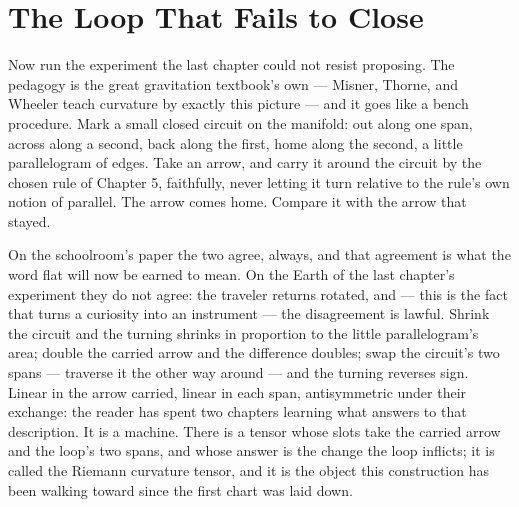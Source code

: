 \chapter{The Loop That Fails to Close}

Now run the experiment the last chapter could not resist proposing. The
pedagogy is the great gravitation textbook's own --- Misner, Thorne, and
Wheeler teach curvature by exactly this picture --- and it goes like a
bench procedure. Mark a small closed circuit on the manifold: out along
one span, across along a second, back along the first, home along the
second, a little parallelogram of edges. Take an arrow, and carry it
around the circuit by the chosen rule of Chapter 5, faithfully, never
letting it turn relative to the rule's own notion of parallel. The arrow
comes home. Compare it with the arrow that stayed.

On the schoolroom's paper the two agree, always, and that agreement is
what the word flat will now be earned to mean. On the Earth of the last
chapter's experiment they do not agree: the traveler returns rotated,
and --- this is the fact that turns a curiosity into an instrument ---
the disagreement is lawful. Shrink the circuit and the turning shrinks
in proportion to the little parallelogram's area; double the carried
arrow and the difference doubles; swap the circuit's two spans ---
traverse it the other way around --- and the turning reverses sign.
Linear in the arrow carried, linear in each span, antisymmetric under
their exchange: the reader has spent two chapters learning what answers
to that description. It is a machine. There is a tensor whose slots take
the carried arrow and the loop's two spans, and whose answer is the
change the loop inflicts; it is called the Riemann curvature tensor, and
it is the object this construction has been walking toward since the
first chart was laid down.


